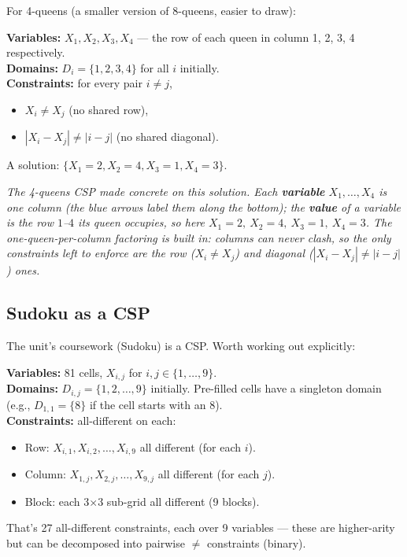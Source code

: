 \documentclass[11pt, a4paper]{article}
\begin{document}
For 4-queens (a smaller version of 8-queens, easier to draw):

\begin{exbox}
\textbf{Variables:} $X_1, X_2, X_3, X_4$ — the row of each queen in column 1, 2, 3, 4 respectively.\\
\textbf{Domains:} $D_i = \{1, 2, 3, 4\}$ for all $i$ initially.\\
\textbf{Constraints:} for every pair $i \neq j$,
\begin{itemize}[itemsep=0pt, topsep=0pt]
  \item $X_i \neq X_j$ (no shared row),
  \item $|X_i - X_j| \neq |i - j|$ (no shared diagonal).
\end{itemize}
A solution: $\{X_1 = 2, X_2 = 4, X_3 = 1, X_4 = 3\}$.
\end{exbox}

\begin{center}

\footnotesize\textit{The 4-queens CSP made concrete on this solution. Each \textbf{variable} $X_1,\dots,X_4$ is one column (the blue arrows label them along the bottom); the \textbf{value} of a variable is the row $1$--$4$ its queen occupies, so here $X_1{=}2,\ X_2{=}4,\ X_3{=}1,\ X_4{=}3$. The one-queen-per-column factoring is built in: columns can never clash, so the only constraints left to enforce are the row ($X_i\neq X_j$) and diagonal ($|X_i-X_j|\neq|i-j|$) ones.}
\end{center}

\subsection{Sudoku as a CSP}

The unit's coursework (Sudoku) is a CSP. Worth working out explicitly:

\begin{exbox}
\textbf{Variables:} 81 cells, $X_{i,j}$ for $i, j \in \{1, \dots, 9\}$.\\
\textbf{Domains:} $D_{i,j} = \{1, 2, \dots, 9\}$ initially. Pre-filled cells have a singleton domain (e.g., $D_{1,1} = \{8\}$ if the cell starts with an 8).\\
\textbf{Constraints:} all-different on each:
\begin{itemize}[itemsep=0pt, topsep=0pt]
  \item Row: $X_{i,1}, X_{i,2}, \dots, X_{i,9}$ all different (for each $i$).
  \item Column: $X_{1,j}, X_{2,j}, \dots, X_{9,j}$ all different (for each $j$).
  \item Block: each 3$\times$3 sub-grid all different (9 blocks).
\end{itemize}
That's 27 all-different constraints, each over 9 variables — these are higher-arity but can be decomposed into pairwise $\neq$ constraints (binary).
\end{exbox}
\end{document}
